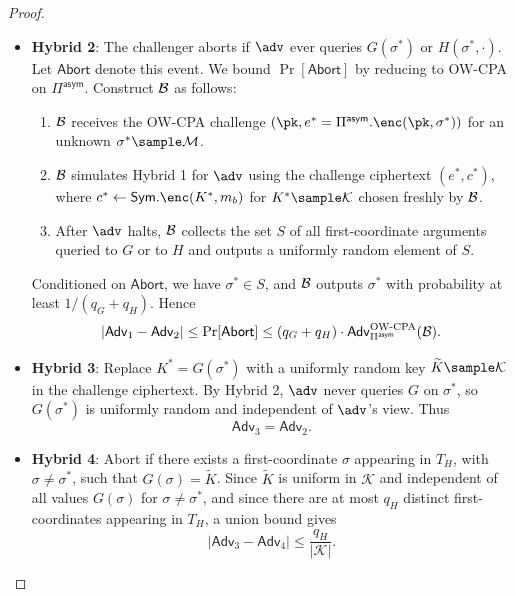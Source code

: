 \begin{proof}
\begin{itemize}
        \item \textbf{Hybrid 2}: The challenger aborts if $\adv$ ever queries $G(\sigma^*)$ or $H(\sigma^*, \cdot)$. Let $\mathsf{Abort}$ denote this event. We bound $\Pr[\mathsf{Abort}]$ by reducing to OW-CPA on $\Pi^{\mathsf{asym}}$. Construct $\mathcal{B}$ as follows:
              \begin{enumerate}
                  \item $\mathcal{B}$ receives the OW-CPA challenge $(\pk, e^* = \Pi^{\mathsf{asym}}.\enc(\pk, \sigma^*))$ for an unknown $\sigma^* \sample \mathcal{M}$.
                  \item $\mathcal{B}$ simulates Hybrid 1 for $\adv$ using the challenge ciphertext $(e^*, c^*)$, where $c^* \gets \mathsf{Sym}.\enc(K^*, m_b)$ for $K^* \sample \mathcal{K}$ chosen freshly by $\mathcal{B}$.
                  \item After $\adv$ halts, $\mathcal{B}$ collects the set $S$ of all first-coordinate arguments queried to $G$ or to $H$ and outputs a uniformly random element of $S$.
              \end{enumerate}
              Conditioned on $\mathsf{Abort}$, we have $\sigma^* \in S$, and $\mathcal{B}$ outputs $\sigma^*$ with probability at least $1/(q_G + q_H)$. Hence
              \[
                  |\mathsf{Adv}_1 - \mathsf{Adv}_2|
                  \leq
                  \Pr[\mathsf{Abort}]
                  \leq
                  (q_G + q_H)\cdot \mathsf{Adv}^{\text{OW-CPA}}_{\Pi^{\mathsf{asym}}}(\mathcal{B}).
              \]

        \item \textbf{Hybrid 3}: Replace $K^* = G(\sigma^*)$ with a uniformly random key $\widetilde{K} \sample \mathcal{K}$ in the challenge ciphertext. By Hybrid 2, $\adv$ never queries $G$ on $\sigma^*$, so $G(\sigma^*)$ is uniformly random and independent of $\adv$'s view. Thus
              \[
                  \mathsf{Adv}_3 = \mathsf{Adv}_2.
              \]

        \item \textbf{Hybrid 4}: Abort if there exists a first-coordinate $\sigma$ appearing in $T_H$, with $\sigma \neq \sigma^*$, such that $G(\sigma) = \widetilde{K}$. Since $\widetilde{K}$ is uniform in $\mathcal{K}$ and independent of all values $G(\sigma)$ for $\sigma \neq \sigma^*$, and since there are at most $q_H$ distinct first-coordinates appearing in $T_H$, a union bound gives
              \[
                  |\mathsf{Adv}_3 - \mathsf{Adv}_4|
                  \leq
                  \frac{q_H}{|\mathcal{K}|}.
              \]


\end{itemize}
\end{proof}
